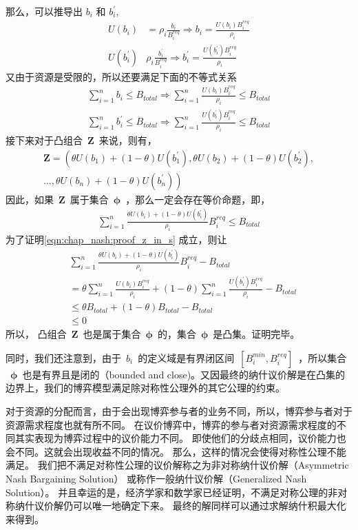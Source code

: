 那么，可以推导出 $b_i$ 和 $ b_i^\prime$,
\begin{align*}
    U(b_i) &= \rho_i \frac{b_i}{B_i^{req}} \Rightarrow b_i = \frac{U(b_i)B_i^{req}}{\rho_i} \\
    U(b_i^\prime) & \rho_i \frac{b_i^\prime} {B_i^{req}} \Rightarrow b_i^\prime = \frac{U(b_i^\prime) B_i^{req}}{\rho_i}
\end{align*}
又由于资源是受限的，所以还要满足下面的不等式关系
\begin{align*}
    \sum_{i=1}^n b_i \le B_{total} \Rightarrow \sum_{i=1}^n \frac{U(b_i)B_i^{req}}{\rho_i} \le B_{total}\\
    \sum_{i=1}^n b_i^\prime \le B_{total}\Rightarrow \sum_{i=1}^n \frac{U(b_i^\prime)B_i^{req}}{\rho_i} \le B_{total}
\end{align*}
接下来对于凸组合~$\mathbf{Z}$~来说，则有，
\begin{align*}
    \mathbf{Z} = \left( \theta U(b_1) + (1-\theta) U(b_1^\prime),    \theta U(b_2) + (1-\theta) U(b_2^\prime), \right. \\
    \ldots,  \left. \theta U(b_n) + (1-\theta) U(b_n^\prime) \right)
\end{align*}
因此，如果~$\mathbf{Z}$~属于集合~$\mathbf{\phi}$~，那么一定会存在等价命题，即，
\begin{align}
    \sum_{i=1}^{n} \frac{ \theta U(b_i) + (1-\theta) U(b_i^\prime)}{\rho_i} B_i^{req} \le B_{total}
    \label{eqn:chap_nash:proof_z_in_s}
\end{align}
为了证明\eqref{eqn:chap_nash:proof_z_in_s} 成立，则让
\begin{align*}
    &\sum_{i=1}^{n} \frac{ \theta U(b_i) + (1-\theta) U(b_i^\prime)}{\rho_i} B_i^{req} - B_{total} \\
    &= \theta \sum_{i=1}^n \frac{U(b_i)B_i^{req}}{\rho_i} + (1-\theta) \sum_{i=1}^n \frac{U(b_i^\prime)B_i^{req}}{\rho_i} -B_{total} \\
    &\le \theta B_{total} + (1-\theta)B_{total} - B_{total}\\
    & \le 0
\end{align*}
所以，
凸组合~$\mathbf{Z}$~也是属于集合~$\mathbf{\phi}$~的，集合~$\mathbf{\phi}$~是凸集。证明完毕。

同时，我们还注意到，由于~$b_i$~的定义域是有界闭区间~$[B_i^{min},B_i^{req}]$~，所以集合
~$\mathbf{\phi}$~也是有界且是闭的（bounded and close)。又因最终的纳什议价解是在凸集的边界上，我们的博弈模型满足除对称性公理外的其它公理的约束。

对于资源的分配而言，由于会出现博弈参与者的业务不同，所以，博弈参与者对于资源需求程度也就有所不同。
在议价博弈中，博弈的参与者对资源需求程度的不同其实表现为博弈过程中的议价能力不同。
即使他们的分歧点相同，议价能力也会不同。这就会出现收益不同的情况。
那么，这样的情况会使得对称性公理不能满足。
我们把不满足对称性公理的议价解称之为非对称纳什议价解（Asymmetric Nash Bargaining Solution）
或称作一般纳什议价解（Generalized  Nash  Solution）。
并且幸运的是，经济学家和数学家已经证明，不满足对称公理的非对称纳什议价解仍可以唯一地确定下来\cite{Osborne_Rubinstein_1994}。
最终的解同样可以通过求解纳什积最大化来得到。

